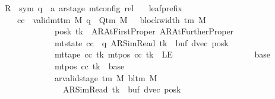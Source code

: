 \begin{isabellebody}
\ \ \ \ \ R{\isacharprime}{\kern0pt}\ {\isacharcolon}{\kern0pt}{\isacharcolon}{\kern0pt}\ {\isachardoublequoteopen}{\isacharparenleft}{\kern0pt}sym{}{\isacharcomma}{\kern0pt}\ {\isacharprime}{\kern0pt}q\ {\isasymtimes}\ {\isacharprime}{\kern0pt}a\ ar{\isacharunderscore}{\kern0pt}stage{\isacharparenright}{\kern0pt}\ mt{\isacharunderscore}{\kern0pt}config\ rel{\isachardoublequoteclose}\isanewline
\ \ \ leaf{\isacharunderscore}{\kern0pt}prefix{\isacharcolon}{\kern0pt}\isanewline
\ \ \ \ \ \ \ \ {\isachardoublequoteopen}{\isasymAnd}cc{\isachardot}{\kern0pt}\ {\isasymlbrakk}\ valid{\isacharunderscore}{\kern0pt}mttm\ M{\isacharsemicolon}{\kern0pt}\ q\ {\isasymin}\ Q{\isacharunderscore}{\kern0pt}tm\ M{\isacharsemicolon}{\kern0pt}\ {}\ {\isasymle}\ block{\isacharunderscore}{\kern0pt}width\ {\isacharparenleft}{\kern0pt}{\isasymGamma}{\isacharunderscore}{\kern0pt}tm\ M{\isacharparenright}{\kern0pt}{\isacharsemicolon}{\kern0pt}\isanewline
\ \ \ \ \ \ \ \ \ \ \ \ \ \ \ \ \ posk\ tk\ {\isasymin}\ {\isacharbraceleft}{\kern0pt}AR{\isacharunderscore}{\kern0pt}AtFirstProper{\isacharcomma}{\kern0pt}\ AR{\isacharunderscore}{\kern0pt}AtFurtherProper{\isacharbraceright}{\kern0pt}{\isacharsemicolon}{\kern0pt}\isanewline
\ \ \ \ \ \ \ \ \ \ \ \ \ \ \ \ \ mt{\isacharunderscore}{\kern0pt}state\ cc\ {\isacharequal}{\kern0pt}\ {\isacharparenleft}{\kern0pt}q{\isacharcomma}{\kern0pt}\ AR{\isacharunderscore}{\kern0pt}SimRead{\isacharcomma}{\kern0pt}\ tk{\isacharcomma}{\kern0pt}\ {}{\isacharcomma}{\kern0pt}\ buf{\isacharcomma}{\kern0pt}\ dvec{\isacharcomma}{\kern0pt}\ posk{\isacharparenright}{\kern0pt}{\isacharsemicolon}{\kern0pt}\isanewline
\ \ \ \ \ \ \ \ \ \ \ \ \ \ \ \ \ mt{\isacharunderscore}{\kern0pt}tape\ cc\ tk\ {\isacharparenleft}{\kern0pt}mt{\isacharunderscore}{\kern0pt}pos\ cc\ tk{\isacharparenright}{\kern0pt}\ {\isasymnoteq}\ LE{}{\isacharsemicolon}{\kern0pt}\isanewline
\ \ \ \ \ \ \ \ \ \ \ \ \ \ \ \ \ {}\ {\isacharless}{\kern0pt}\ base{\isacharsemicolon}{\kern0pt}\isanewline
\ \ \ \ \ \ \ \ \ \ \ \ \ \ \ \ \ mt{\isacharunderscore}{\kern0pt}pos\ cc\ tk\ {\isacharequal}{\kern0pt}\ base{\isacharsemicolon}{\kern0pt}\isanewline
\ \ \ \ \ \ \ \ \ \ \ \ \ \ \ \ \ ar{\isacharunderscore}{\kern0pt}valid{\isacharunderscore}{\kern0pt}stage\ {\isacharparenleft}{\kern0pt}{\isasymGamma}{\isacharunderscore}{\kern0pt}tm\ M{\isacharparenright}{\kern0pt}\ {\isacharparenleft}{\kern0pt}bl{\isacharunderscore}{\kern0pt}tm\ M{\isacharparenright}{\kern0pt}\isanewline
\ \ \ \ \ \ \ \ \ \ \ \ \ \ \ \ \ \ \ {\isacharparenleft}{\kern0pt}AR{\isacharunderscore}{\kern0pt}SimRead{\isacharcomma}{\kern0pt}\ tk{\isacharcomma}{\kern0pt}\ {}{\isacharcomma}{\kern0pt}\ buf{\isacharcomma}{\kern0pt}\ dvec{\isacharcomma}{\kern0pt}\ posk{\isacharparenright}{\kern0pt}{\isacharsemicolon}{\kern0pt}\isanewline

\end{isabellebody}
